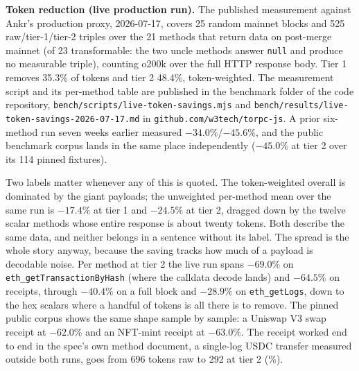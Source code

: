 \documentclass[11pt]{article}
\newcommand{\code}[1]{\texttt{#1}}
\begin{document}
\textbf{Token reduction (live production run).} The published measurement against Ankr's production proxy, 2026-07-17, covers 25 random mainnet blocks and 525 raw/tier-1/tier-2 triples over the 21 methods that return data on post-merge mainnet (of 23 transformable: the two uncle methods answer \code{null} and produce no measurable triple), counting o200k over the full HTTP response body. Tier 1 removes 35.3\% of tokens and tier 2 48.4\%, token-weighted. The measurement script and its per-method table are published in the benchmark folder of the code repository, \code{bench/scripts/live-token-savings.mjs} and \code{bench/results/live-token-savings-2026-07-17.md} in \code{github.com/w3tech/torpc-js}. A prior six-method run seven weeks earlier measured $-34.0\%$/$-45.6\%$, and the public benchmark corpus lands in the same place independently ($-45.0\%$ at tier 2 over its 114 pinned fixtures).

Two labels matter whenever any of this is quoted. The token-weighted overall is dominated by the giant payloads; the unweighted per-method mean over the same run is $-17.4\%$ at tier 1 and $-24.5\%$ at tier 2, dragged down by the twelve scalar methods whose entire response is about twenty tokens. Both describe the same data, and neither belongs in a sentence without its label. The spread is the whole story anyway, because the saving tracks how much of a payload is decodable noise. Per method at tier 2 the live run spans $-69.0\%$ on \code{eth\_getTransactionByHash} (where the calldata decode lands) and $-64.5\%$ on receipts, through $-40.4\%$ on a full block and $-28.9\%$ on \code{eth\_getLogs}, down to the hex scalars where a handful of tokens is all there is to remove. The pinned public corpus shows the same shape sample by sample: a Uniswap V3 swap receipt at $-62.0\%$ and an NFT-mint receipt at $-63.0\%$. The receipt worked end to end in the spec's own method document, a single-log USDC transfer measured outside both runs, goes from 696 tokens raw to 292 at tier 2 (\%).
\end{document}
